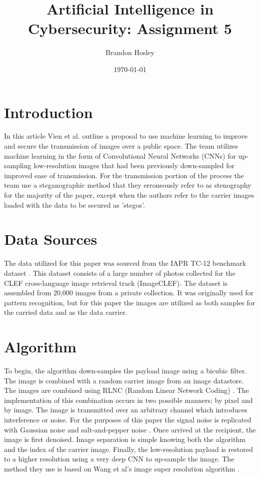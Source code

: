 \documentclass[]{article}
\title{Artificial Intelligence in Cybersecurity: Assignment 5}
\author{Brandon Hosley}
\date{\today}
\begin{document}
	\maketitle
	
\section{Introduction}

In this article Vien et al.\cite{Vien2021} outline a proposal to use machine learning to improve and secure the transmission of images over a public space.
The team utilizes machine learning in the form of Convolutional Neural Networks (CNNs) for up-sampling low-resolution images that had been previously down-sampled for improved ease of transmission.
For the transmission portion of the process the team use a steganographic method that they erroneously refer to as stenography for the majority of the paper, except when the authors refer to the carrier images loaded with the data to be secured as 'stegos'.

\section{Data Sources}

The data utilized for this paper was sourced from the IAPR TC-12 benchmark dataset \cite{Grubinger2006}.
This dataset consists of a large number of photos collected for the 
CLEF cross-language image retrieval track (ImageCLEF).
The dataset is assembled from 20,000 images from a private collection.
It was originally used for pattern recognition, but for this paper the images are utilized as both samples for the carried data and as the data carrier.

\section{Algorithm}

To begin, the algorithm down-samples the payload image using a bicubic filter.
The image is combined with a random carrier image from an image datastore.
The images are combined using RLNC (Random Linear Network Coding) 
\cite{Koetter2003}.
The implementation of this combination occurs in two possible manners; 
by pixel and by image.
The image is transmitted over an arbitrary channel which introduces interference or noise.
For the purposes of this paper the signal noise is replicated with 
Gaussian noise \cite{ Zhang2017} and 
salt-and-pepper noise \cite{Chan2005}.
Once arrived at the recipient, the image is first denoised.
Image separation is simple knowing both the algorithm and the index of the carrier image.
Finally, the low-resolution payload is restored to a higher resolution using a very deep CNN to up-sample the image.
The method they use is based on Wang et al's image super resolution algorithm \cite{Wang2020}.
\end{document}

